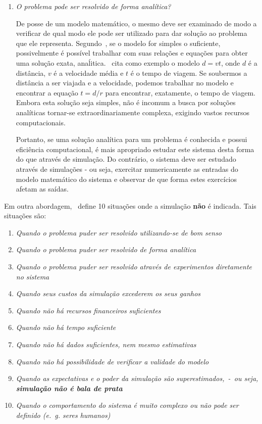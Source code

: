 \begin{enumerate}
\item \textit{O problema pode ser resolvido de forma analítica?}

De posse de um modelo matemático, o mesmo deve ser examinado de modo a verificar
de qual modo ele pode ser utilizado para dar solução ao problema que ele
representa. Segundo~\cite{Law}, se o modelo for simples o suficiente,
possivelmente é possível trabalhar com suas relações e equações para obter uma
solução exata, anaĺitica.~\cite{Law} cita como exemplo o modelo $d = vt$, onde
$d$ é a distância, $v$ é a velocidade média e $t$ é o tempo de viagem. Se
soubermos a distância a ser viajada e a velocidade, podemos trabalhar no modelo
e encontrar a equação $t = d/r$ para encontrar, exatamente, o tempo de viagem.
Embora esta solução seja simples, não é incomum a busca por soluções analíticas
tornar-se extraordinariamente complexa, exigindo vastos recursos computacionais.

Portanto, se uma solução analítica para um problema é conhecida e possui
eficiência computacional, é mais apropriado estudar este sistema desta forma do
que através de simulação. Do contrário, o sistema deve ser estudado através de
simulações - ou seja, exercitar numericamente as entradas do modelo matemático
do sistema e observar de que forma estes exercícios afetam as saídas.
\end{enumerate}

Em outra abordagem,~\cite{BanksGibson} define 10 situações onde a simulação
\textbf{não} é indicada. Tais situações são:

\begin{enumerate}
\item \textit{Quando o problema puder ser resolvido utilizando-se de bom senso}
\item \textit{Quando o problema puder ser resolvido de forma analítica}
\item \textit{Quando o problema puder ser resolvido através de experimentos
      diretamente no sistema}
\item \textit{Quando seus custos da simulação excederem os seus ganhos}
\item \textit{Quando não há recursos financeiros suficientes}
\item \textit{Quando não há tempo suficiente}
\item \textit{Quando não há dados suficientes, nem mesmo estimativas}
\item \textit{Quando não há possibilidade de verificar a validade do modelo}
\item \textit{Quando as expectativas e o poder da simulação são
      superestimados,~-~ou seja, \textbf{simulação não é bala de prata}}
\item \textit{Quando o comportamento do sistema é muito complexo ou não pode ser
      definido (e.~g. seres humanos)}
\end{enumerate}

